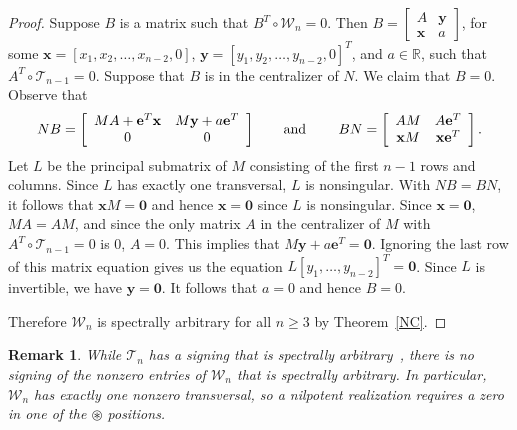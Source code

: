 \documentclass[10pt]{amsart}
\newtheorem{remark}[proposition]{Remark}
\begin{document}
\begin{proof}
Suppose $B$ is a matrix such that
$B^T\circ {\mathcal{W}}_{n}=0$.
 Then $B = \left[ \begin{array}{cc}
A     & \mathbf{y} \\
\mathbf{x} & a \end{array} \right]$, for some $\mathbf{x} = \left[x_1, x_2,\ldots,x_{n-2}, 0\right]$, $\mathbf{y} 
= \left[y_1, y_2,\ldots,y_{n-2}, 0\right]^T$, and $a \in {\mathbb{R}}$, such that  $A^T\circ {\mathcal{T}}_{n-1}=0$.  Suppose that $B$ is in the centralizer of $N$. We claim that $B=0$. Observe that
\begin{equation*}\label{NB}
    NB = \left[ \begin{array}{cc}
MA+\mathbf{e}^T\mathbf{x}     & M\mathbf{y} + a\mathbf{e}^T \\
0                               & 0 \end{array} \right]\qquad \mbox{\rm and \qquad }
    BN = \left[ \begin{array}{cc}
AM     & A\mathbf{e}^T \\
\mathbf{x}M & \mathbf{x}\mathbf{e}^T \end{array} \right].
\end{equation*}
Let $L$ be the principal submatrix of $M$ consisting of the first $n-1$ rows and columns.
Since $L$ has exactly one transversal, $L$ is nonsingular. With $NB=BN$, it follows that $\mathbf{x}M = \mathbf{0}$ 
and hence $\mathbf{x}=\mathbf{0}$ since $L$ is nonsingular. 
Since $\mathbf{x} = \mathbf{0}$, $MA = AM$, and since the only matrix $A$ in the centralizer of $M$ with $A^T\circ{\mathcal{T}}_{n-1}=0$ is $0$, $A = 0$. This implies that $M\mathbf{y} + a\mathbf{e}^T = \mathbf{0}$. 
Ignoring the last row of this matrix equation gives us the equation
$L[y_1,\ldots,y_{n-2}]^T=\mathbf{0}$. 
Since $L$ is invertible,
we have $\mathbf{y}=\mathbf{0}$.
It follows that $a=0$ and hence $B=0$.

Therefore ${\mathcal{W}}_{n}$ is spectrally arbitrary for all $n\geq 3$ by Theorem~\ref{NC}.
\end{proof}

\begin{remark}{\rm 
While ${\mathcal{T}}_n$ has a signing that is spectrally
arbitrary~\cite{GS},  there is no signing of the nonzero
entries of ${\mathcal{W}}_n$ that is spectrally arbitrary. In particular,
${\mathcal{W}}_n$ has exactly one nonzero transversal, so a nilpotent realization
requires a zero in one of the ${\circledast}$ positions.
}\end{remark}
\end{document}

